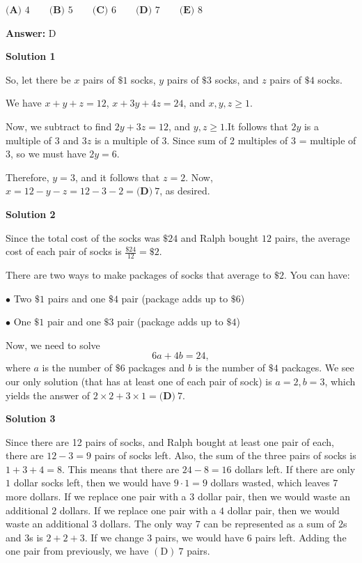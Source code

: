 \begin{enumerate}
 $\textbf{(A) } 4 \qquad \textbf{(B) } 5 \qquad \textbf{(C) } 6 \qquad \textbf{(D) } 7 \qquad \textbf{(E) } 8$

 \textbf{Answer: }D



\textbf{Solution 1}

So, let there be $x$ pairs of $\$1$ socks, $y$ pairs of $\$3$ socks, and $z$ pairs of $\$4$ socks.

 We have $x+y+z=12$, $x+3y+4z=24$, and $x,y,z \ge 1$.

 Now, we subtract to find $2y+3z=12$, and $y,z \ge 1$.It follows that $2y$ is a multiple of $3$ and $3z$ is a multiple of $3$. Since sum of 2 multiples of 3 = multiple of 3, so we must have $2y=6$.

 Therefore, $y=3$, and it follows that $z=2$. Now, $x=12-y-z=12-3-2=\boxed{\textbf{(D)}~7}$, as desired.

 



\textbf{Solution 2}

Since the total cost of the socks was $\$24$ and Ralph bought $12$ pairs, the average cost of each pair of socks is $\frac{\$24}{12} = \$2$.

 There are two ways to make packages of socks that average to $\$2$. You can have:

 $\bullet$ Two $\$1$ pairs and one $\$4$ pair (package adds up to $\$6$)

 $\bullet$ One $\$1$ pair and one $\$3$ pair (package adds up to $\$4$)

 Now, we need to solve
 \[6a+4b=24,\]where $a$ is the number of $\$6$ packages and $b$ is the number of $\$4$ packages. We see our only solution (that has at least one of each pair of sock) is $a=2, b=3$, which yields the answer of $2\times2+3\times1 = \boxed{\textbf{(D)}~7}$.

 



\textbf{Solution 3}

Since there are 12 pairs of socks, and Ralph bought at least one pair of each, there are $12-3=9$ pairs of socks left. Also, the sum of the three pairs of socks is $1+3+4=8$. This means that there are $24-8=16$ dollars left. If there are only $1$ dollar socks left, then we would have $9\cdot1=9$ dollars wasted, which leaves $7$ more dollars. If we replace one pair with a $3$ dollar pair, then we would waste an additional $2$ dollars. If we replace one pair with a $4$ dollar pair, then we would waste an additional $3$ dollars. The only way $7$ can be represented as a sum of $2$s and $3$s is $2+2+3$. If we change $3$ pairs, we would have $6$ pairs left. Adding the one pair from previously, we have $\boxed{(\text{D})~7}$ pairs.


\end{enumerate}

